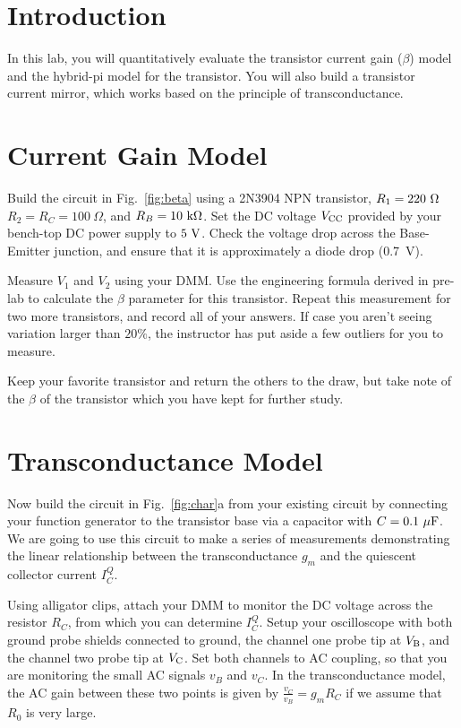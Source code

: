 \documentclass[12pt]{article}
\begin{document}
\section{Introduction}

In this lab, you will quantitatively evaluate the transistor current gain ($\beta$) model and the hybrid-pi model for the transistor.  You will also build a transistor current mirror,  which works based on the principle of transconductance.

\section{Current Gain Model}

Build the circuit in Fig.~\ref{fig:beta} using a 2N3904 NPN transistor, $R_1=220~\rm \Omega$ $R_2=R_C=100~\Omega$, and $R_B = 10~\rm k\Omega$.  Set the DC voltage $V_{\rm CC}$ provided by your bench-top DC power supply to $5~\rm V$.  Check the voltage drop across the Base-Emitter junction, and ensure that it is approximately a diode drop (0.7~\rm V).

Measure $V_1$ and $V_2$ using your DMM.  Use the engineering formula derived in pre-lab to calculate the $\beta$ parameter for this transistor.  Repeat this measurement for two more transistors, and record all of your answers.  If case you aren't seeing variation larger than $20\%$, the instructor has put aside a few outliers for you to measure.

Keep your favorite transistor and return the others to the draw, but take note of the $\beta$ of the transistor which you have kept for further study.

\section{Transconductance Model}

Now build the circuit in Fig.~\ref{fig:char}a from your existing circuit by connecting your function generator to the transistor base via a capacitor with $C=0.1~\rm \mu F$.  We are going to use this circuit to make a series of measurements demonstrating the linear relationship between the transconductance $g_m$ and the quiescent collector current $I_C^Q$.

Using alligator clips, attach your DMM  to monitor the DC voltage across the resistor $R_C$, from which you can determine $I_C^Q$.  Setup your oscilloscope with both ground probe shields connected to ground, the channel one probe tip at $V_{\rm B}$, and the channel two probe tip at $V_{\rm C}$.  Set both channels to AC coupling, so that you are monitoring the small AC signals $v_B$ and $v_C$.  In the transconductance model, the AC gain between these two points is given by $\frac{v_C}{v_B} = g_m R_C$ if we assume that $R_0$ is very large.
\end{document}
